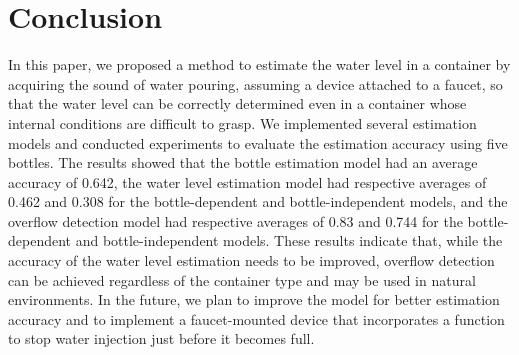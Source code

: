 \documentclass[sigconf,authordraft]{acmart}
\begin{document}
\section{Conclusion}
\label{sec:conclution}
In this paper, we proposed a method to estimate the water level in a container by acquiring the sound of water pouring, assuming a device attached to a faucet, so that the water level can be correctly determined even in a container whose internal conditions are difficult to grasp. We implemented several estimation models and conducted experiments to evaluate the estimation accuracy using five bottles. The results showed that the bottle estimation model had an average accuracy of 0.642, the water level estimation model had respective averages of 0.462 and 0.308 for the bottle-dependent and bottle-independent models, and the overflow detection model had respective averages of 0.83 and 0.744 for the bottle-dependent and bottle-independent models. These results indicate that, while the accuracy of the water level estimation needs to be improved, overflow detection can be achieved regardless of the container type and may be used in natural environments. In the future, we plan to improve the model for better estimation accuracy and to implement a faucet-mounted device that incorporates a function to stop water injection just before it becomes full.








\end{document}
